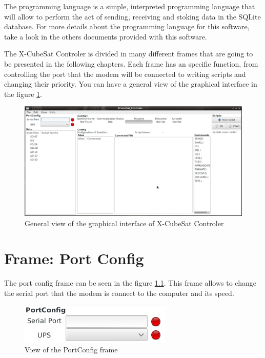 \documentclass[pdftex,11pt,a4paper,titlepage]{report}
\begin{document}
The programming language is a simple, interpreted programming language that will allow to perform the act of sending, receiving and stoking data in the SQLite database. For more details about the programming language for this software, take a look in the others documents provided with this software. 

The X-CubeSat Controler is divided in many different frames that are going to be presented in the following chapters. Each frame has an specific function, from controlling the port that the modem will be connected to writing scripts and changing their priority. You can have a general view of the graphical interface in the figure \ref{GeneralView}.
\begin{figure}[h]
\centering
\includegraphics[scale=0.35]{../images/GeneralView.png}
\caption{General view of the graphical interface of X-CubeSat Controler}
\label{GeneralView}
\end{figure}

\chapter{Frame: Port Config}
\hspace{0.4cm} The port config frame can be seen in the figure \ref{PortConfigFrame}. This frame allows to change the serial port that the modem is connect to the computer and its speed.
\begin{figure}[h]
\centering
\includegraphics[scale=0.9]{../images/PortConfigFrame.png}
\caption{View of the PortConfig frame}
\label{PortConfigFrame}
\end{figure}
\end{document}
